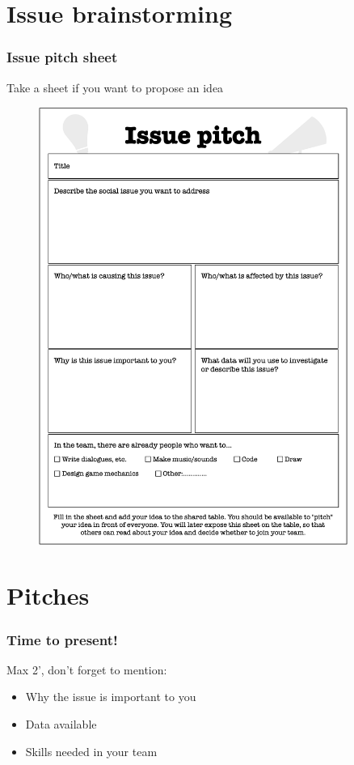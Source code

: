 \documentclass{beamer}
\begin{document}
\section{Issue brainstorming}
\begin{frame}
\frametitle{Issue pitch sheet}
Take a sheet if you want to propose an idea
\begin{figure}
\includegraphics[width=0.9\textwidth, angle=10]{figures/issue_pitch.png}
\end{figure}
\end{frame}

\section{Pitches}
\begin{frame}
\frametitle{Time to present!}
Max 2', don't forget to mention:
\begin{itemize}
    \item Why the issue is important to you
    \item Data available
    \item Skills needed in your team
\end{itemize}
\begin{figure}

\end{figure}
\end{frame}
\end{document}
